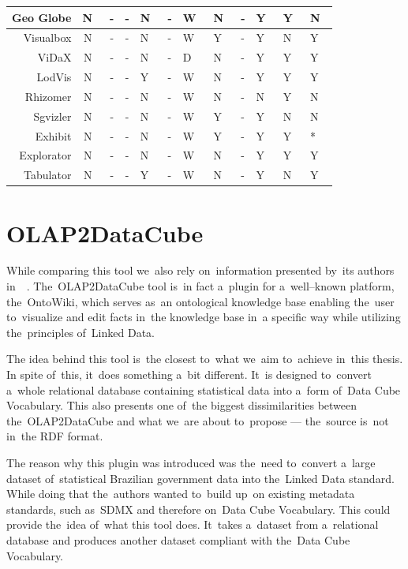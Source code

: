 \begin{tabularx}{\textwidth}{ |r|C|C|C|X|X|X|X|X|X|X|X| }
  Geo Globe             & N~& - & - & N~& - & W~& N~& - & Y~& Y~& N~\\ \hline
  Visualbox              & N~& - & - & N~& - & W~& Y~& - & Y~& N~& Y~\\ \hline
  ViDaX                    & N~& - & - & N~& - & D~& N~& - & Y~& Y~& Y~\\ \hline
  LodVis                   & N~& - & - & Y~& - & W~& N~& - & Y~& Y~& Y~\\ \hline
  Rhizomer              & N~& - & - & N~& - & W~& N~& - & N~& Y~& N~\\ \hline
  Sgvizler                 & N~& - & - & N~& - & W~& Y~& - & Y~& N~& N~\\ \hline
  Exhibit                  & N~& - & - & N~& - & W~& Y~& - & Y~& Y~& * \\ \hline
  Explorator             & N~& - & - & N~& - & W~& N~& - & Y~& Y~& Y~\\ \hline
  Tabulator              & N~& - & - & Y~& - & W~& N~& - & Y~& N~& Y~\\ \hline
\end{tabularx}

\section{OLAP2DataCube}
\label{olap2dc}
\label{rw:olap2dc}
While comparing this tool we~also rely on~information presented by~its authors in~~\cite{olap2dc-paper}. The~OLAP2DataCube tool is~in fact a~plugin for a~well--known 
platform, the~OntoWiki, which serves as~an ontological knowledge base enabling
the~user to~visualize and edit facts in~the knowledge base in~a specific way
while utilizing the~principles of~Linked Data.

The idea behind this tool is~the closest to~what we~aim to~achieve in~this thesis.
In spite of~this, it~does something a~bit different. It~is designed to~convert a~whole relational database containing statistical data into a~form of~Data Cube 
Vocabulary. This also presents one of~the biggest dissimilarities between the~OLAP2DataCube and 
what we~are about to~propose --- the~source is~not in~the RDF format.

The reason why this plugin was introduced was the~need to~convert a~large 
dataset of~statistical Brazilian government data into the~Linked Data standard.
While doing that the~authors wanted to~build up~on existing metadata standards, 
such as~SDMX and therefore on~Data Cube Vocabulary. This could provide the~idea of~what this tool does. It~takes a~dataset from a~relational database and produces 
another dataset compliant with the~Data Cube Vocabulary.

